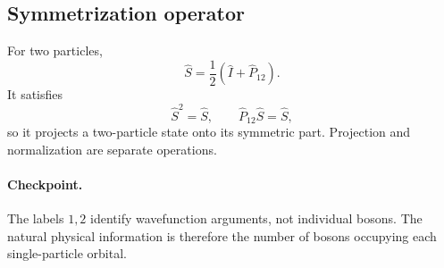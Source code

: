 \subsection{Symmetrization operator}

For two particles,
\[
\hat S=\frac12(\hat I+\hat P_{12}).
\]
It satisfies
\[
\hat S^2=\hat S,
\qquad
\hat P_{12}\hat S=\hat S,
\]
so it projects a two-particle state onto its symmetric part. Projection and
normalization are separate operations.

\paragraph{Checkpoint.}
The labels $1,2$ identify wavefunction arguments, not individual bosons. The
natural physical information is therefore the number of bosons occupying each
single-particle orbital.
